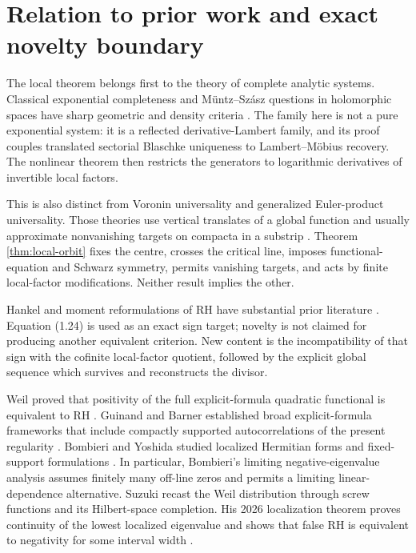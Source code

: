\documentclass[11pt]{article}
\begin{document}
\section{Relation to prior work and exact novelty boundary}\label{sec:literature}

The local theorem belongs first to the theory of complete analytic systems.  Classical
exponential completeness and M\"untz--Sz\'asz questions in holomorphic spaces have sharp
geometric and density criteria
\cite{Poltoratski2013,PelosoSalvatori2017,KhabibullinKudasheva2023}.  The family here is not a
pure exponential system: it is a reflected derivative-Lambert family, and its proof couples
translated sectorial Blaschke uniqueness to Lambert--M\"obius recovery.  The nonlinear theorem
then restricts the generators to logarithmic derivatives of invertible local factors.

This is also distinct from Voronin universality and generalized Euler-product universality.
Those theories use vertical translates of a global function and usually approximate
nonvanishing targets on compacta in a substrip
\cite{Voronin1975,LamzouriLesterRadziwill2018}.  Theorem \ref{thm:local-orbit} fixes the centre,
crosses the critical line, imposes functional-equation and Schwarz symmetry, permits vanishing
targets, and acts by finite local-factor modifications.  Neither result implies the other.

Hankel and moment reformulations of RH have substantial prior literature
\cite{Matiyasevich2007,Matiyasevich2017,BickelPascoeSargent2023}.  Equation (1.24) is used as an
exact sign target; novelty is not claimed for producing another equivalent criterion.  New
content is the incompatibility of that sign with the cofinite local-factor quotient, followed by
the explicit global sequence which survives and reconstructs the divisor.

Weil proved that positivity of the full explicit-formula quadratic functional is equivalent to RH
\cite{Weil1952}.  Guinand and Barner established broad explicit-formula frameworks that include
compactly supported autocorrelations of the present regularity
\cite{Guinand1949,Barner1981}.  Bombieri and Yoshida studied localized Hermitian forms and
fixed-support formulations \cite{Bombieri2000,Bombieri2003,Yoshida1992}.  In particular,
Bombieri's limiting negative-eigenvalue analysis assumes finitely many off-line zeros and permits
a limiting linear-dependence alternative.  Suzuki recast the Weil distribution through screw
functions and its Hilbert-space completion.  His 2026 localization theorem proves continuity of
the lowest localized eigenvalue and shows that false RH is equivalent to negativity for some
interval width \cite{Suzuki2023,Suzuki2025,Suzuki2026}.
\end{document}
